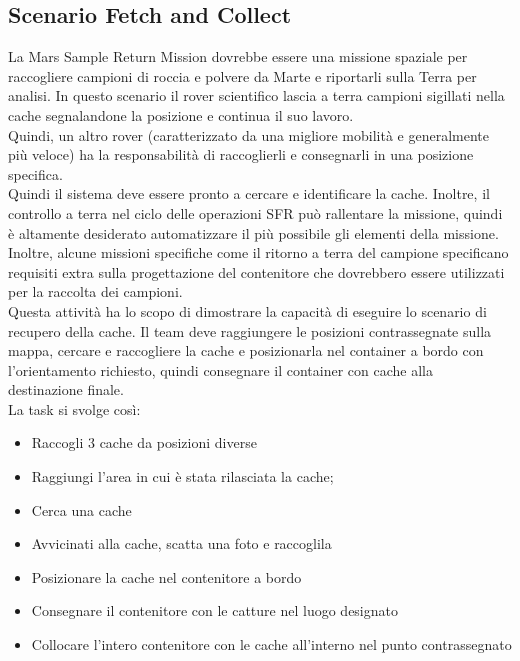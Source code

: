 \documentclass[%
corpo=11pt,
twoside,
 stile=classica,
oldstyle,
greek,%
]{toptesi}
\begin{document}
		\subsection{Scenario Fetch and Collect}
		La Mars Sample Return Mission dovrebbe essere una missione spaziale per raccogliere campioni di roccia e polvere da Marte e riportarli sulla Terra per analisi.
		In questo scenario il rover scientifico lascia a terra campioni sigillati nella cache segnalandone la posizione e continua il suo lavoro. \\
		Quindi, un altro rover (caratterizzato da una migliore mobilità e generalmente più veloce) ha la responsabilità di raccoglierli e consegnarli in una posizione specifica. \\
		 Quindi il sistema deve essere pronto a cercare e identificare la cache. Inoltre, il controllo a terra nel ciclo delle operazioni SFR può rallentare la missione, quindi è altamente desiderato automatizzare il più possibile gli elementi della missione.\\
		  Inoltre, alcune missioni specifiche come il ritorno a terra del campione specificano requisiti extra sulla progettazione del contenitore che dovrebbero essere utilizzati per la raccolta dei campioni.\\
		Questa attività ha lo scopo di dimostrare la capacità di eseguire lo scenario di recupero della cache. Il team deve raggiungere le posizioni contrassegnate sulla mappa, cercare e raccogliere la cache e posizionarla nel container a bordo con l'orientamento richiesto, quindi consegnare il container con cache alla destinazione finale.\\
		La task si svolge così:
		\begin{itemize}
		\item Raccogli 3 cache da posizioni diverse
		\item Raggiungi l'area in cui è stata rilasciata la cache;
		\item Cerca una cache
		\item Avvicinati alla cache, scatta una foto e raccoglila  
		\item Posizionare la cache nel contenitore a bordo
		\item Consegnare il contenitore con le catture nel luogo designato
		\item Collocare l'intero contenitore con le cache all'interno nel punto contrassegnato
		\end{itemize}
		
\end{document}
